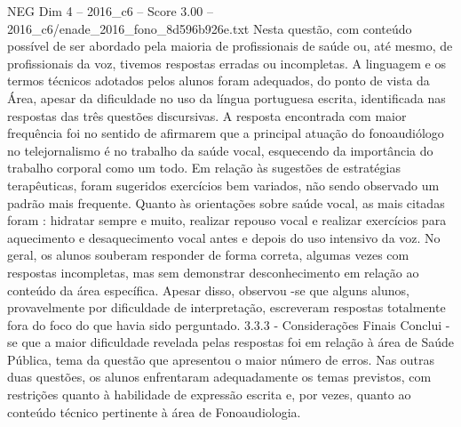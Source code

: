 \begin{textsample}{NEG Dim 4 – 2016\_c6 – Score 3.00 – 2016\_c6/enade\_2016\_fono\_8d596b926e.txt}
Nesta questão, com conteúdo possível de ser abordado pela maioria de profissionais de saúde ou, até mesmo, de profissionais da voz, tivemos respostas erradas ou incompletas.
A linguagem e os termos técnicos adotados pelos alunos foram adequados, do ponto de vista da Área, apesar da dificuldade no uso da língua portuguesa escrita, identificada nas respostas das três questões discursivas.
A resposta encontrada com maior frequência foi no sentido de afirmarem que a principal atuação do fonoaudiólogo no telejornalismo é no trabalho da saúde vocal, esquecendo da importância do trabalho corporal como um todo.
Em relação às sugestões de estratégias terapêuticas, foram sugeridos exercícios bem variados, não sendo observado um padrão mais frequente.
Quanto às orientações sobre saúde vocal, as mais citadas foram : hidratar sempre e muito, realizar repouso vocal e realizar exercícios para aquecimento e desaquecimento vocal antes e depois do uso intensivo da voz.
No geral, os alunos souberam responder de forma correta, algumas vezes com respostas incompletas, mas sem demonstrar desconhecimento em relação ao conteúdo da área específica.
Apesar disso, observou -se que alguns alunos, provavelmente por dificuldade de interpretação, escreveram respostas totalmente fora do foco do que havia sido perguntado. 3.3.3 - Considerações Finais Conclui -se que a maior dificuldade revelada pelas respostas foi em relação à área de Saúde Pública, tema da questão que apresentou o maior número de erros.
Nas outras duas questões, os alunos enfrentaram adequadamente os temas previstos, com restrições quanto à habilidade de expressão escrita e, por vezes, quanto ao conteúdo técnico pertinente à área de Fonoaudiologia.

\end{textsample}
